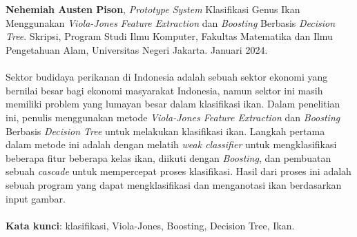 \chapter*{}
\singlespacing{}

\textbf{Nehemiah Austen Pison}, \textit{Prototype System} Klasifikasi Genus Ikan 
Menggunakan \textit{Viola-Jones Feature Extraction} dan \textit{Boosting} Berbasis 
\textit{Decision Tree}. Skripsi, Program Studi Ilmu Komputer, Fakultas Matematika dan Ilmu Pengetahuan Alam, Universitas Negeri Jakarta. Januari 2024.
\\
\\
Sektor budidaya perikanan di Indonesia adalah 
sebuah sektor ekonomi yang bernilai besar bagi ekonomi 
masyarakat Indonesia, namun sektor ini masih memiliki problem yang lumayan besar 
dalam klasifikasi ikan.
Dalam penelitian ini, penulis menggunakan 
metode \emph{Viola-Jones Feature Extraction} dan \textit{Boosting} Berbasis 
\emph{Decision Tree} untuk melakukan klasifikasi ikan. Langkah pertama dalam metode ini adalah dengan melatih \emph{weak classifier} 
untuk mengklasifikasi beberapa fitur beberapa kelas ikan, diikuti dengan \emph{Boosting}, 
dan pembuatan sebuah \emph{cascade} untuk mempercepat proses klasifikasi. Hasil dari proses ini adalah 
sebuah program yang dapat mengklasifikasi dan menganotasi ikan berdasarkan input gambar.
\\
\\
\textbf{Kata kunci}: klasifikasi, Viola-Jones, Boosting, Decision Tree, Ikan.